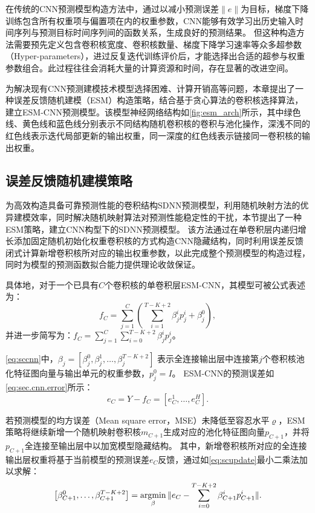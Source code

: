 在传统的CNN预测模型构造方法中，通过以减小预测误差$\| e \|$为目标，梯度下降训练包含所有权重项与偏置项在内的权重参数，CNN能够有效学习出历史输入时间序列与预测目标时间序列间的函数关系，生成良好的预测结果。
但这种构造方法需要预先定义包含卷积核宽度、卷积核数量、梯度下降学习速率等众多超参数（Hyper-parameters），进过反复迭代训练评价后，才能选择出合适的超参与权重参数组合。此过程往往会消耗大量的计算资源和时间，存在显著的改进空间。


为解决现有CNN预测建模技术模型选择困难、计算开销高等问题，本章提出了一种误差反馈随机建模（ESM）构造策略，结合基于贪心算法的卷积核选择算法，建立ESM-CNN预测模型。该模型神经网络结构如\autoref{fig:esm_arch}所示，其中绿色线、黄色线和蓝色线分别表示不同结构随机卷积核的卷积与池化操作，深浅不同的红色线表示迭代局部更新的输出权重，同一深度的红色线表示链接同一卷积核的输出权重。

\subsection{误差反馈随机建模策略\label{sec:esm.esm}}
为高效构造具备可靠预测性能的卷积结构SDNN预测模型，利用随机映射方法的优异建模效率，同时解决随机映射算法对预测性能稳定性的干扰，本节提出了一种ESM策略，建立CNN构型下的SDNN预测模型。
该方法通过在单卷积层内递归增长添加固定随机初始化权重卷积核的方式构造CNN隐藏结构，同时利用误差反馈闭式计算新增卷积核所对应的输出权重参数，以此完成整个预测模型的构造过程，同时为模型的预测函数拟合能力提供理论收敛保证。

具体地，对于一个已具有$C$个卷积核的单卷积层ESM-CNN，其模型可被公式表述为：
\begin{equation}
    \label{eq:sccnn}
    f_C = \sum^C_{j=1} \left( \sum^{T-K+2}_{i=1}\beta_{j}^i p_j^i + \beta^0_j \right),
\end{equation}
并进一步简写为：$f_C= \sum^C_{j=1}\sum^{T-K+2}_{i=0} \beta_j^i p_j^i$。



\autoref{eq:sccnn}中，$\beta_j = [\beta_j^0, \beta_j^1, \ldots, \beta_j^{T-K+2}]$ 表示全连接输出层中连接第$j$个卷积核池化特征图向量与输出单元的权重参数，$p_j^0 = I$。
ESM-CNN的预测误差如\autoref{eq:sec.cnn.error}所示：
\begin{equation}
    e_C = Y- f_C = [e_C^1,\ldots, e_C^H]. \label{eq:sec.cnn.error}
\end{equation}

若预测模型的均方误差（Mean square error，MSE）未降低至容忍水平$\varrho$，ESM策略将继续新增一个随机映射卷积核$m_{C+1}$生成对应的池化特征图向量$p_{C+1}$，并将$p_{C+1}$全连接至输出层中以加宽模型隐藏结构。
其中，新增卷积核所对应的全连接输出层权重将基于当前模型的预测误差$e_C$反馈，通过如\autoref{eq:scupdate}最小二乘法加以求解：
\begin{equation}\label{eq:scupdate}
    \left[\beta_{{C+1}}^0, \ldots, \beta_{{C+1}}^{T-K+2} \right]=\operatorname*{argmin} _{\beta}\|e_C -\sum_{i=0}^{T-K+2} \beta_{C+1}^i p_{C+1}^i \|.
\end{equation}

